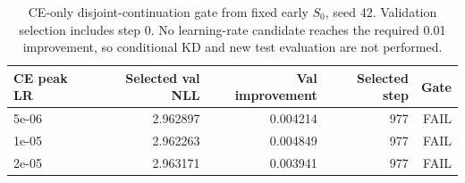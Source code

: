 \begin{table}[htbp]
\centering\small
\begin{tabular}{lrrrr}
\toprule
CE peak LR & Selected val NLL & Val improvement & Selected step & Gate \\
\midrule
5e-06 & 2.962897 & 0.004214 & 977 & FAIL \\
1e-05 & 2.962263 & 0.004849 & 977 & FAIL \\
2e-05 & 2.963171 & 0.003941 & 977 & FAIL \\
\bottomrule
\end{tabular}
\caption{CE-only disjoint-continuation gate from fixed early $S_0$, seed 42. Validation selection includes step 0. No learning-rate candidate reaches the required 0.01 improvement, so conditional KD and new test evaluation are not performed.}
\label{tab:modern_ce_gate}
\end{table}
